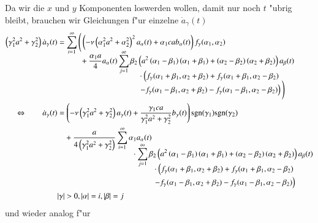 Da wir die $x$ und $y$ Komponenten loswerden wollen, damit nur noch $t$ "ubrig 
bleibt, brauchen wir Gleichungen f"ur einzelne $\dot{a}_\gamma(t)$
\begin{align}
\left(\gamma_1^2 a^2 + \gamma_2^2\right)
\dot{a}_\gamma(t)
&=
\sum_{i = 1}^{\infty}
\Bigg(
\left(
-\nu
\left(\alpha_1^2 a^2+\alpha_2^2\right)^2
a_{\alpha}(t)
+
\alpha_1 c a
b_{\alpha}(t)
\right)
f_\gamma(\alpha_1, \alpha_2) \nonumber
\\[-2ex]
&\phantom{=aaaa{}}
+
\frac{\alpha_1 a}{4}
a_{\alpha}(t)
\sum_{j = 1}^{\infty}
\beta_2
\left(
a^2 \left(\alpha_1 - \beta_1 \right)\left(\alpha_1 + \beta_1 \right)
+ \left(\alpha_2 - \beta_2 \right)\left(\alpha_2 + \beta_2 \right)
\right)
a_{\beta}(t) \nonumber
\\[-2ex]
&\phantom{=-4aapaata..\sum\sum.....{}}
\cdot
\left(
f_\gamma(\alpha_1 + \beta_1, \alpha_2 + \beta_2)
+
f_\gamma(\alpha_1 + \beta_1, \alpha_2 - \beta_2)
\right. \nonumber
\\[-1.5ex]
&\phantom{=-4aapaata..\sum\sum.....{}}
\left.
-
f_\gamma(\alpha_1 - \beta_1, \alpha_2 + \beta_2)
-
f_\gamma(\alpha_1 - \beta_1, \alpha_2 - \beta_2)
\right)
\Bigg) \nonumber
\\
\Leftrightarrow \qquad
\dot{a}_\gamma(t)
&=
\left(
-\nu
\left(\gamma_1^2 a^2+\gamma_2^2\right)
a_{\gamma}(t)
+
\frac{\gamma_1 ca}{\gamma_1^2 a^2 + \gamma_2^2}
b_{\gamma}(t)
\right)
\sgn(\gamma_1)\sgn(\gamma_2) \nonumber
\\
&\phantom{={}}
+
\frac{a}{4 \left(\gamma_1^2 a^2 + \gamma_2^2\right)}
\sum_{i = 1}^{\infty}
\alpha_1
a_{\alpha}(t) \nonumber
\\[-3ex]
&\phantom{=a.-4aapaata...a\sum{}}
\cdot
\sum_{j = 1}^{\infty}
\beta_2
\left(
a^2 \left(\alpha_1 - \beta_1 \right)\left(\alpha_1 + \beta_1 \right)
+ \left(\alpha_2 - \beta_2 \right)\left(\alpha_2 + \beta_2 \right)
\right)
a_{\beta}(t) \nonumber
\\[-2ex]
&\phantom{=a.-4aapaata...a\sum....\sum{}}
\cdot
\left(
f_\gamma(\alpha_1 + \beta_1, \alpha_2 + \beta_2)
+
f_\gamma(\alpha_1 + \beta_1, \alpha_2 - \beta_2)
\right. \nonumber
\\[-.5ex]
&\phantom{=a.-4aapaata...a\sum....\sum{}}
\left.
-
f_\gamma(\alpha_1 - \beta_1, \alpha_2 + \beta_2)
-
f_\gamma(\alpha_1 - \beta_1, \alpha_2 - \beta_2)
\right)
\label{equation:lorenz2:dota}
\\
&|\gamma| > 0, |\alpha| = i, |\beta| = j \nonumber
\end{align}
und wieder analog f"ur
